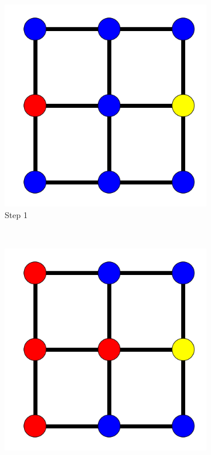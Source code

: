 \documentclass[bsc,frontabs,twoside,singlespacing,parskip,deptreport]{infthesis}     %
\begin{document}
\begin{figure}
  	\vspace{-25pt}
    \centering
    \begin{subfigure}[b]{0.18\textwidth}
        \includegraphics[width=\textwidth]{simpleProcess1}
        \caption{Step 1}
        \label{fig:simpleProcess1}
    \end{subfigure}
    ~ %
    \begin{subfigure}[b]{0.18\textwidth}
        \includegraphics[width=\textwidth]{simpleProcess2}

\end{subfigure}
\end{figure}
\end{document}
